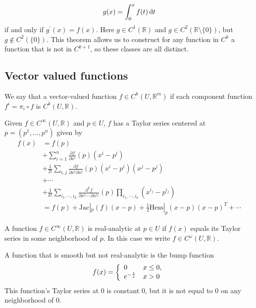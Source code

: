 \begin{theorem}
$$
g(x) = \int_0^x f(t) \mathop{}\!\mathrm{d} t
$$
if and only if $g^\prime(x) = f(x)$. Here $g \in C^1(\mathbb{R})$ and
$g \in C^2(\mathbb{R} \setminus \{ 0 \})$, but
$g \notin C^2(\{ 0 \})$. This theorem allows us to construct for any
function in $C^k$ a function that is not in $C^{k+1}$, so these
classes are all distinct.
\end{theorem}

\subsection{Vector valued functions}
We say that a vector-valued function
$f \in C^k(U, \mathbb{R}^m)$ if each component function
$f^i = \pi_i \circ f$ is $C^k(U, \mathbb{R})$.

Given $f \in C^\infty(U, \mathbb{R})$ and $p \in U$,
$f$ has a Taylor series centered at $p = (p^1, \dots, p^n)$ given by
\begin{align*}
  f(x)
&= f(p) \\
&+ \sum_{i=1}^n
    \frac{\partial f}
         {\partial x^i}(p)
    (x^i - p^i) \\
&+ \frac{1}{2!}
    \sum_{i,j}
      \frac{\partial f}
           {\partial x^i \partial x^j}(p)
      (x^i - p^i)
      (x^j - p^j) \\
&+  \cdots \\
&+  \frac{1}{k!}
    \sum_{i_1, \cdots, i_k}
      \frac{\partial^k f}
           {\partial x^{i_1} \cdots \partial x^{i_k}}(p)
      \prod_{i_1, \cdots, i_k} (x^{i_j} - p^{i_j}) \\
&= f(p)
 + \mathrm{Jac}|_p(f) (x - p)
 + \frac{1}{2} \mathrm{Hess}|_p (x - p)(x - p)^T
 + \cdots
\end{align*}

\begin{defn}
A function $f \in C^\infty (U, \mathbb{R})$ is real-analytic at $p \in
U$ if $f(x)$ equals its Taylor series in some neighborhood of $p$.
In this case we write $f \in C^\omega(U, \mathbb{R})$.
\end{defn}

\begin{xmpl}
A function that is smooth but not real-analytic is the bump function
$$
  f(x)
= \left\{
    \begin{array}{l l}
      0             & x \leq 0, \\
      e^{-\frac{1}{x}} & x > 0
    \end{array}
  \right.
$$
This function's Taylor series at 0 is constant 0, but it is not equal
to 0 on any neighborhood of 0.
\end{xmpl}

